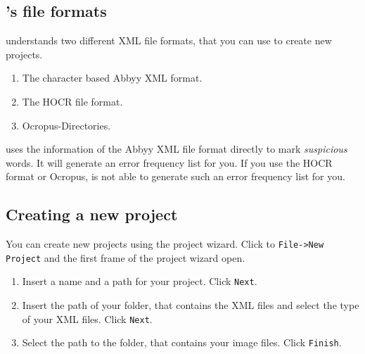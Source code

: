 \subsection{\pocoto{}'s file formats}
\begin{frame}
	\pocoto{} understands two different XML file formats, that you can use
	to create new projects.
	\begin{enumerate}
		\item The character based Abbyy XML format.
		\item The HOCR file format.
		\item Ocropus-Directories.
	\end{enumerate}
	\pocoto{} uses the information of the Abbyy XML file format directly to mark
	\emph{suspicious} words. It will generate an error frequency list for you. If
	you use the HOCR format or Ocropus, \pocoto{} is not able to generate such an
	error frequency list for you.
\end{frame}

\subsection{Creating a new project}
\begin{frame}

	You can create new projects using the project wizard. Click to
	\texttt{File->New Project} and the first frame of the project wizard
	open.
	\begin{enumerate}
		\item Insert a name and a path for your project. Click \texttt{Next}.
		\item Insert the path of your folder, that contains the XML files and
			select the type of your XML files. Click \texttt{Next}.
		\item Select the path to the folder, that contains your image
			files. Click \texttt{Finish}.
	\end{enumerate}
\end{frame}

